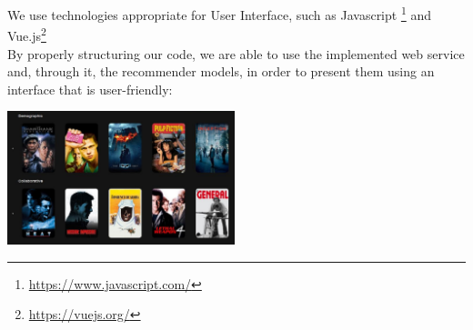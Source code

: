 We use technologies appropriate for User Interface, such as Javascript
\footnote{\href{https://www.javascript.com/}{https://www.javascript.com/}}
and Vue.js\footnote{\href{https://vuejs.org/}{https://vuejs.org/}}\\
By properly structuring our code, we are able to use the implemented web service and,
through it, the recommender models, in order to present them using an interface that is user-friendly:\\
\begin{center}
    \captionsetup{type=figure}
    \includegraphics[width=250px]{images/front.png}
\end{center}
